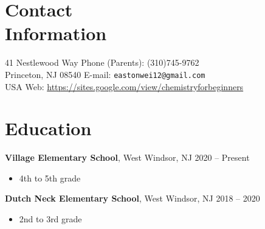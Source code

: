 \documentclass[line,margin]{res}
\begin{document}


\begin{resume}


  \section{Contact \\ Information}
  41 Nestlewood Way \hfill Phone (Parents): (310)745-9762 \\
  Princeton, NJ 08540 \hfill E-mail: \nolinkurl{eastonwei12@gmail.com} \\
  USA \hfill Web: \url{https://sites.google.com/view/chemistryforbeginners}
  \vskip -0.1in

  \section{Education}
  {\bf  Village Elementary School}, West Windsor, NJ  \hfill 2020 -- Present
  \vskip 0.05in
  \begin{itemize}
    \item 4th to 5th grade
  \end{itemize}
  \vskip -0.05in
  {\bf Dutch Neck Elementary School}, West Windsor, NJ \hfill 2018 -- 2020
  \vskip 0.05in
  \begin{itemize}
    \item  2nd to 3rd grade
  \end{itemize}


\end{resume}
\end{document}
